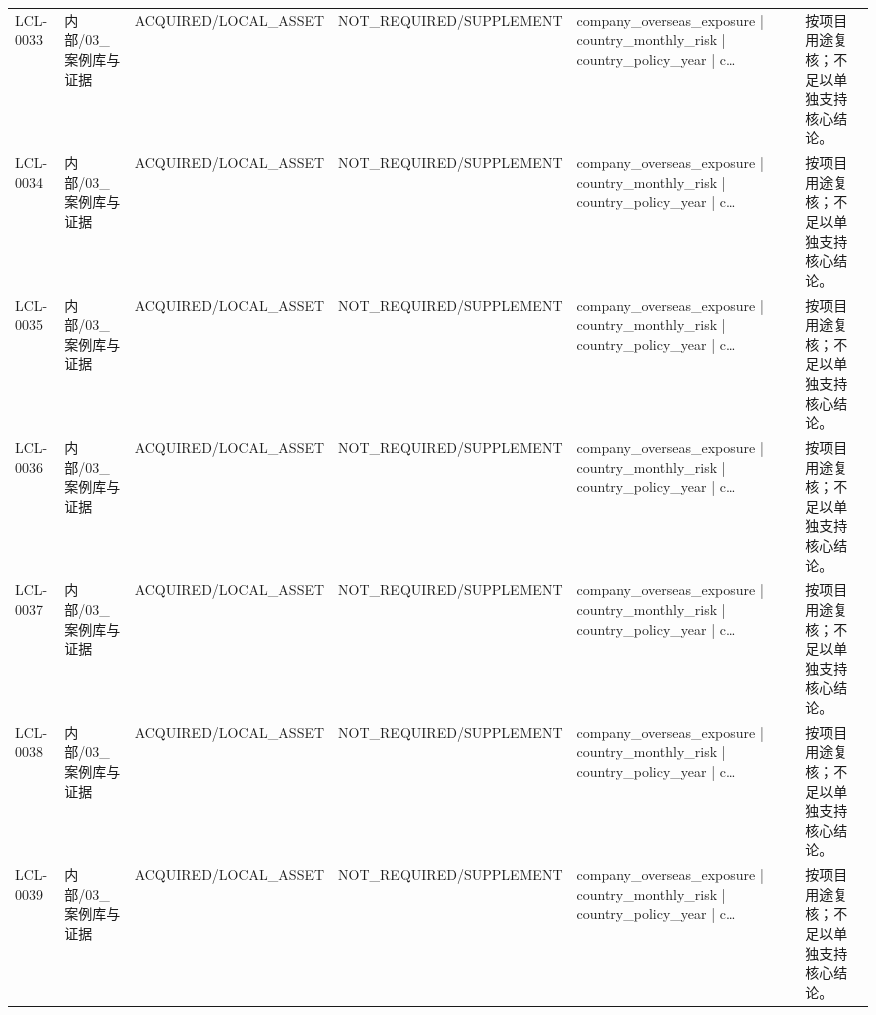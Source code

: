 \begin{landscape}
\begin{longtable}{p{1.8cm}p{2.6cm}p{2.6cm}p{2.6cm}p{4.8cm}p{7.2cm}}
LCL-0033 & 内部/\allowbreak{}03\_\allowbreak{}案例库与证据 & ACQUIRED/\allowbreak{}LOCAL\_\allowbreak{}ASSET & NOT\_\allowbreak{}REQUIRED/\allowbreak{}SUPPLEMENT & company\_\allowbreak{}overseas\_\allowbreak{}exposure | country\_\allowbreak{}monthly\_\allowbreak{}risk | country\_\allowbreak{}policy\_\allowbreak{}year | c… & 按项目用途复核；不足以单独支持核心结论。\\
LCL-0034 & 内部/\allowbreak{}03\_\allowbreak{}案例库与证据 & ACQUIRED/\allowbreak{}LOCAL\_\allowbreak{}ASSET & NOT\_\allowbreak{}REQUIRED/\allowbreak{}SUPPLEMENT & company\_\allowbreak{}overseas\_\allowbreak{}exposure | country\_\allowbreak{}monthly\_\allowbreak{}risk | country\_\allowbreak{}policy\_\allowbreak{}year | c… & 按项目用途复核；不足以单独支持核心结论。\\
LCL-0035 & 内部/\allowbreak{}03\_\allowbreak{}案例库与证据 & ACQUIRED/\allowbreak{}LOCAL\_\allowbreak{}ASSET & NOT\_\allowbreak{}REQUIRED/\allowbreak{}SUPPLEMENT & company\_\allowbreak{}overseas\_\allowbreak{}exposure | country\_\allowbreak{}monthly\_\allowbreak{}risk | country\_\allowbreak{}policy\_\allowbreak{}year | c… & 按项目用途复核；不足以单独支持核心结论。\\
LCL-0036 & 内部/\allowbreak{}03\_\allowbreak{}案例库与证据 & ACQUIRED/\allowbreak{}LOCAL\_\allowbreak{}ASSET & NOT\_\allowbreak{}REQUIRED/\allowbreak{}SUPPLEMENT & company\_\allowbreak{}overseas\_\allowbreak{}exposure | country\_\allowbreak{}monthly\_\allowbreak{}risk | country\_\allowbreak{}policy\_\allowbreak{}year | c… & 按项目用途复核；不足以单独支持核心结论。\\
LCL-0037 & 内部/\allowbreak{}03\_\allowbreak{}案例库与证据 & ACQUIRED/\allowbreak{}LOCAL\_\allowbreak{}ASSET & NOT\_\allowbreak{}REQUIRED/\allowbreak{}SUPPLEMENT & company\_\allowbreak{}overseas\_\allowbreak{}exposure | country\_\allowbreak{}monthly\_\allowbreak{}risk | country\_\allowbreak{}policy\_\allowbreak{}year | c… & 按项目用途复核；不足以单独支持核心结论。\\
LCL-0038 & 内部/\allowbreak{}03\_\allowbreak{}案例库与证据 & ACQUIRED/\allowbreak{}LOCAL\_\allowbreak{}ASSET & NOT\_\allowbreak{}REQUIRED/\allowbreak{}SUPPLEMENT & company\_\allowbreak{}overseas\_\allowbreak{}exposure | country\_\allowbreak{}monthly\_\allowbreak{}risk | country\_\allowbreak{}policy\_\allowbreak{}year | c… & 按项目用途复核；不足以单独支持核心结论。\\
LCL-0039 & 内部/\allowbreak{}03\_\allowbreak{}案例库与证据 & ACQUIRED/\allowbreak{}LOCAL\_\allowbreak{}ASSET & NOT\_\allowbreak{}REQUIRED/\allowbreak{}SUPPLEMENT & company\_\allowbreak{}overseas\_\allowbreak{}exposure | country\_\allowbreak{}monthly\_\allowbreak{}risk | country\_\allowbreak{}policy\_\allowbreak{}year | c… & 按项目用途复核；不足以单独支持核心结论。\\

\end{longtable}
\end{landscape}
